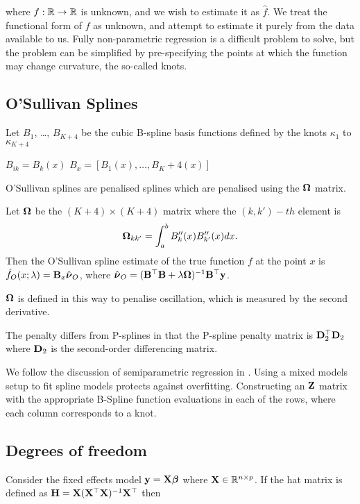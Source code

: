 where $f: {\mathbb{R}} \to {\mathbb{R}}$ is unknown, and we wish to estimate it as $\hat{f}$. We treat the functional form of
$f$ as unknown, and attempt to estimate it purely from the data available to us. Fully non-parametric regression
is a difficult problem to solve, but the problem can be simplified by pre-specifying the points at which the
function may change curvature, the so-called knots.

\subsection{O'Sullivan Splines}

Let $B_1$, \ldots, $B_{K+4}$ be the cubic B-spline basis functions defined by the knots $\kappa_1$ to
$\kappa_{K+4}$

$B_{ik} = B_k (x)$
$B_x = [B_1(x), \ldots, B_K+4(x)]$

O'Sullivan splines are penalised splines which are penalised using the ${\boldsymbol \Omega}$ matrix.

Let ${\boldsymbol \Omega}$ be the $(K+4) \times (K+4)$ matrix where the $(k, k')-th$ element is
\[
	{\boldsymbol \Omega}_{k k'} = \int_a^b B''_k(x) B''_{k'}(x) dx.
\]
Then the O'Sullivan spline estimate of the true function $f$ at the point $x$ is
$\hat{f}_O(x; \lambda) = {\bf B}_x \hat{{\boldsymbol \nu}}_O$, where
$\hat{{\boldsymbol \nu}}_O = ({\bf B}^\top {\bf B} + \lambda {\boldsymbol\Omega})^{-1} {\bf B}^\top {\bf y}$.

${\boldsymbol \Omega}$ is defined in this way to penalise oscillation, which is measured by the second derivative.

The penalty differs from P-splines in that the P-spline penalty matrix is ${\bf D}_2^\top {\bf D}_2$ where ${\bf D}_2$ is
the second-order differencing matrix.

We follow the discussion of semiparametric regression in \cite{RuppertWandCarroll}.
Using a mixed models setup to fit spline models protects against overfitting.
Constructing an ${\bf Z}$ matrix with the appropriate B-Spline function evaluations in each of the rows, where
each column corresponds to a knot.

\subsection{Degrees of freedom}


Consider the fixed effects model ${\bf y} = {\bf X} {\boldsymbol \beta}$ where ${\bf X} \in {\mathbb{R}}^{n \times p}$. If the hat matrix is
defined as ${\bf H} = {\bf X} ({\bf X}^\top{\bf X})^{-1} {\bf X}^\top$ then

